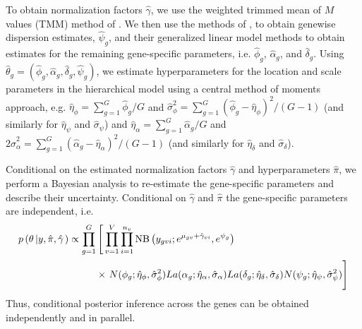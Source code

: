 \documentclass[useAMS,usenatbib,referee]{biom}
\begin{document}
To obtain normalization factors $\hat{\gamma}$, we use the weighted trimmed mean of $M$ values (TMM) method of \cite{robinson2010scaling}. We then use the methods of \cite{mccarthy2012differential}, to obtain genewise dispersion estimates, $\hat{\psi}_g$, and their generalized linear model methods to obtain estimates for the remaining gene-specific parameters, i.e. $\hat{\phi}_g$, $\hat{\alpha}_g$, and $\hat{\delta}_g$. Using $\hat{\theta}_g = (\hat{\phi}_g,\hat{\alpha}_g,\hat{\delta}_g,\hat{\psi}_g)$, we estimate hyperparameters for the location and scale parameters in the hierarchical model using a central method of moments approach, e.g. $\hat{\eta}_\phi = \sum_{g=1}^G \hat{\phi}_g/G$ and $\hat{\sigma}_\phi^2 = \sum_{g=1}^G (\hat{\phi}_g - \hat{\eta}_\phi)^2/(G-1)$ (and similarly for $\hat{\eta}_\psi$ and $\hat{\sigma}_\psi$) and $\hat{\eta}_\alpha = \sum_{g=1}^G \hat{\alpha}_g/G$ and $2\hat{\sigma}_\alpha^2 = \sum_{g=1}^G (\hat{\alpha}_g - \hat{\eta}_\alpha)^2/(G-1)$ (and similarly for $\hat{\eta}_\delta$ and $\hat{\sigma}_\delta$). 

Conditional on the estimated normalization factors $\hat{\gamma}$ and hyperparameters $\hat{\pi}$, we perform a Bayesian analysis to re-estimate the gene-specific parameters and describe their uncertainty. Conditional on $\hat{\gamma}$ and $\hat{\pi}$ the gene-specific parameters are independent, i.e.
\begin{equation}
\begin{split}
p\left(\theta\left|y,\hat{\pi},\hat{\gamma}\right.\right) 
\propto \prod_{g=1}^G & \left[ \,\prod_{v=1}^V \prod_{i=1}^{n_v} \mbox{NB}\left(y_{gvi};e^{\mu_{gv}+\hat{\gamma}_{vi}},e^{\psi_g}\right)  \right. \\
&\times 
\left. \vphantom{\prod_{v=1}^V}
N(\phi_g;\hat{\eta}_\phi, \hat{\sigma}_\phi^2)
La(\alpha_g;\hat{\eta}_\alpha, \hat{\sigma}_\alpha)
La(\delta_g;\hat{\eta}_\delta, \hat{\sigma}_\delta)
N(\psi_g;\hat{\eta}_\psi, \hat{\sigma}_\psi^2) 
\right]
\label{e:condind}
\end{split}
\end{equation}
Thus, conditional posterior inference across the genes can be obtained independently and in parallel.
\end{document}
